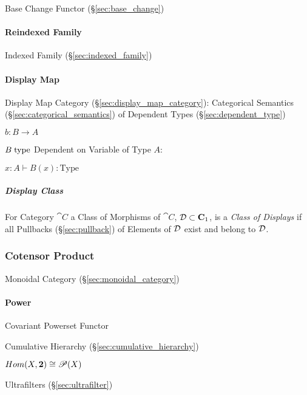 Base Change Functor (\S\ref{sec:base_change})



\paragraph{Reindexed Family}\label{sec:reindexed_family}\hfill

Indexed Family (\S\ref{sec:indexed_family})



\paragraph{Display Map}\label{sec:display_map}\hfill

Display Map Category (\S\ref{sec:display_map_category}): Categorical
Semantics (\S\ref{sec:categorical_semantics}) of Dependent Types
(\S\ref{sec:dependent_type})

$b : B \rightarrow A$

$B \;\mathrm{type}$ Dependent on Variable of Type $A$:

$x:A \vdash B(x):\mathrm{Type}$



\subparagraph{Display Class}\label{sec:display_class}\hfill

For Category $\cat{C}$ a Class of Morphisms of $\cat{C}$, $\mathcal{D}
\subset \mathbf{C}_1$, is a \emph{Class of Displays} if all Pullbacks
(\S\ref{sec:pullback}) of Elements of $\mathcal{D}$ exist and belong to
$\mathcal{D}$.



\subsubsection{Cotensor Product}\label{sec:cotensor_product}

Monoidal Category (\S\ref{sec:monoidal_category})



\paragraph{Power}\label{sec:power}\hfill

Covariant Powerset Functor %

Cumulative Hierarchy (\S\ref{sec:cumulative_hierarchy})

$Hom(X,\mathbf{2}) \cong \mathscr{P}(X)$

Ultrafilters (\S\ref{sec:ultrafilter})

